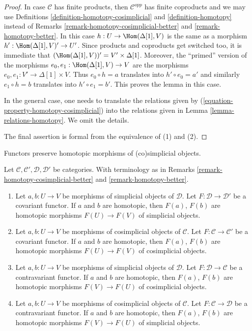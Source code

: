 \begin{proof}
In case $\mathcal{C}$ has finite products, then $\mathcal{C}^{opp}$
has finite coproducts and we may use
Definitions \ref{definition-homotopy-cosimplicial}
and \ref{definition-homotopy} instead of
Remarks \ref{remark-homotopy-cosimplicial-better} and
\ref{remark-homotopy-better}.
In this case $h : U \to \Hom(\Delta[1], V)$
is the same as a morphism $h' : \Hom(\Delta[1], V)' \to U'$.
Since products and coproducts get switched too, it is immediate
that $(\Hom(\Delta[1], V))' = V' \times \Delta[1]$.
Moreover, the ``primed'' version of the morphisms
$e_0, e_1 : \Hom(\Delta[1], V) \to V$ are the morphisms
$e_0, e_1 : V' \to \Delta[1] \times V$.
Thus $e_0 \circ h = a$ translates into $h' \circ e_0 = a'$ and
similarly $e_1 \circ h = b$ translates into $h' \circ e_1 = b'$.
This proves the lemma in this case.

\medskip\noindent
In the general case, one needs to translate the relations given
by (\ref{equation-property-homotopy-cosimplicial}) into the relations
given in Lemma \ref{lemma-relations-homotopy}. We omit the details.

\medskip\noindent
The final assertion is formal from the equivalence of (1) and (2).
\end{proof}

\begin{lemma}
\label{lemma-functorial-homotopy}
\begin{slogan}
Functors preserve homotopic morphisms of (co)simplicial objects.
\end{slogan}
Let $\mathcal{C}, \mathcal{C}', \mathcal{D}, \mathcal{D}'$ be categories.
With terminology as in Remarks \ref{remark-homotopy-cosimplicial-better} and
\ref{remark-homotopy-better}.
\begin{enumerate}
\item Let $a, b : U \to V$ be morphisms of simplicial objects
of $\mathcal{D}$. Let $F : \mathcal{D} \to \mathcal{D}'$ be a covariant
functor. If $a$ and $b$ are homotopic, then $F(a)$, $F(b)$
are homotopic morphisms $F(U) \to F(V)$ of simplicial objects.
\item Let $a, b : U \to V$ be morphisms of cosimplicial objects
of $\mathcal{C}$. Let $F : \mathcal{C} \to \mathcal{C}'$ be a covariant
functor. If $a$ and $b$ are homotopic, then $F(a)$, $F(b)$
are homotopic morphisms $F(U) \to F(V)$ of cosimplicial objects.
\item Let $a, b : U \to V$ be morphisms of simplicial objects of $\mathcal{D}$.
Let $F : \mathcal{D} \to \mathcal{C}$ be a contravariant
functor. If $a$ and $b$ are homotopic, then $F(a)$, $F(b)$
are homotopic morphisms $F(V) \to F(U)$ of cosimplicial objects.
\item Let $a, b : U \to V$ be morphisms of cosimplicial objects of
$\mathcal{C}$.
Let $F : \mathcal{C} \to \mathcal{D}$ be a contravariant
functor. If $a$ and $b$ are homotopic, then $F(a)$, $F(b)$
are homotopic morphisms $F(V) \to F(U)$ of simplicial objects.
\end{enumerate}
\end{lemma}

